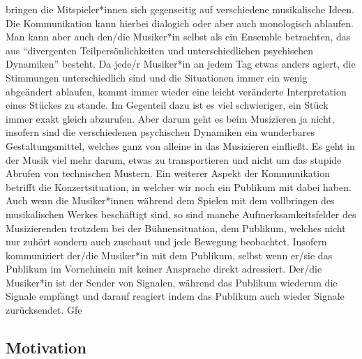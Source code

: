 bringen die Mitspieler*innen sich gegenseitig auf verschiedene musikalische
Ideen. Die Kommunikation kann hierbei dialogich oder aber auch monologisch
ablaufen. \autocite[61]{doerne:umfassend_musizieren} Man kann aber auch den/die
Musiker*in selbst als ein Ensemble betrachten, das aus \enquote{divergenten
Teilpersönlichkeiten und unterschiedlichen psychischen Dynamiken} besteht.
\autocite[64]{doerne:umfassend_musizieren} Da jede/r Musiker*in an jedem Tag
etwas anders agiert, die Stimmungen unterschiedlich sind und die Situationen
immer ein wenig abgeändert ablaufen, kommt immer wieder eine leicht veränderte
Interpretation eines Stückes zu stande. Im Gegenteil dazu ist es viel
schwieriger, ein Stück immer exakt gleich abzurufen. Aber darum geht es beim
Musizieren ja nicht, insofern sind die verschiedenen psychischen Dynamiken ein
wunderbares Gestaltungsmittel, welches ganz von alleine in das Musizieren
einfließt. Es geht in der Musik viel mehr darum, etwas zu transportieren und
nicht um das stupide Abrufen von technischen Mustern. Ein weiterer Aspekt der
Kommunikation betrifft die Konzertsituation, in welcher wir noch ein Publikum
mit dabei haben. Auch wenn die Musiker*innen während dem Spielen mit dem
vollbringen des musikalischen Werkes beschäftigt sind, so sind manche
Aufmerksamkeitsfelder des Musizierenden trotzdem bei der Bühnensituation, dem
Publikum, welches nicht nur zuhört sondern auch zuschaut und jede Bewegung
beobachtet. Insofern kommuniziert der/die Musiker*in mit dem Publikum, selbst
wenn er/sie das Publikum im Vornehinein mit keiner Ansprache direkt adressiert.
Der/die Musiker*in ist der Sender von Signalen, während das Publikum wiederum
die Signale empfängt und darauf reagiert indem das Publikum auch wieder Signale
zurücksendet. Gfe





\subsection{Motivation}

